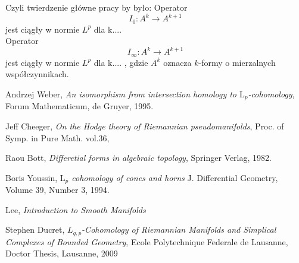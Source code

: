 \documentclass[licencjacka]{pracamgr}
\theoremstyle{definition}
\theoremstyle{definition}
\theoremstyle{plain}
\theoremstyle{plain}
\begin{document}
Czyli twierdzenie główne pracy by było: Operator
\[
 I_0:A^k \to A^{k+1}
\]
jest ciągły w normie $L^p$ dla k.... \\

Operator
\[
I_\infty:A^k \to A^{k+1}
\] jest ciągły w normie $L^p$ dla k.... ,
gdzie $A^k$ oznacza $k$-formy o mierzalnych współczynnikach. \\



\begin{thebibliography}{99}

 Andrzej Weber, \textit{An isomorphism from
  intersection homology to $\mathrm{L}_p$-cohomology}, Forum
  Mathematicum, de Gruyer, 1995.
  
 Jeff Cheeger, \textit{On the Hodge theory
  of Riemannian pseudomanifolds}, Proc. of Symp. in Pure Math. vol.36,


 Raou Bott, \textit{Differetial forms in algebraic
  topology}, Springer Verlag, 1982.

 Boris Youssin, \textit{$\mathrm{L}_p$
  cohomology of cones and horns } J. Differential Geometry, Volume 39,
  Number 3, 1994.
  
 Lee, \textit{Introduction to Smooth Manifolds}

 Stephen Ducret, \textit{$L_{q,p}$-Cohomology of Riemannian
    Manifolds and Simplical Complexes of Bounded Geometry}, Ecole Polytechnique Federale
    de Lausanne, Doctor Thesis, Lausanne, 2009

\end{thebibliography}
\end{document}
